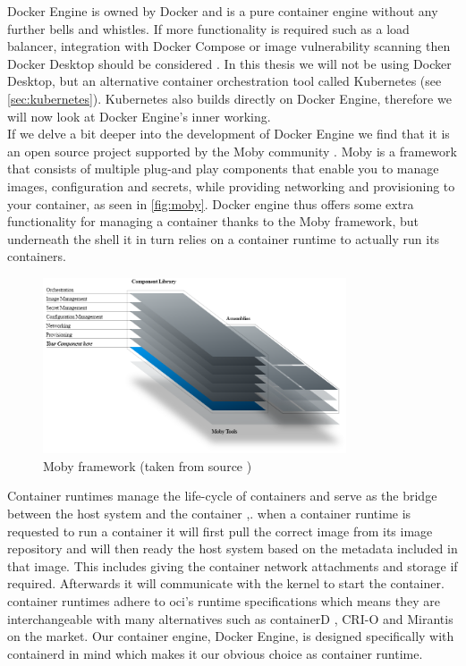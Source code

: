 Docker Engine is owned by Docker \cite{docker} and is a pure container engine without any further bells and whistles. If more functionality is required such as a load balancer, integration with Docker Compose or image vulnerability scanning then Docker Desktop should be considered \cite{comparisonenginevsdesktop}. In this thesis we will not be using Docker Desktop, but an alternative container orchestration tool called Kubernetes (see \autoref{sec:kubernetes}). Kubernetes also builds directly on Docker Engine, therefore we will now look at Docker Engine's inner working.
\\[10pt]

If we delve a bit deeper into the development of Docker Engine we find that it is an open source project supported by the Moby community \cite{moby}. Moby is a framework that consists of multiple plug-and play components that enable you to manage images, configuration and secrets, while providing networking  and provisioning to your container, as seen in \autoref{fig:moby}. Docker engine thus offers some extra functionality for managing a container thanks to the Moby framework, but underneath the shell it in turn relies on a container runtime to actually run its containers.
\\[10pt]

\begin{figure}[htbp]
  \centering
  \includegraphics[width=0.8\textwidth]{images/moby.png} 
  \caption{Moby framework (taken from source \cite{moby})}
  \label{fig:moby}
\end{figure}

 Container runtimes manage the life-cycle of containers and serve as the bridge between the host system and the container \cite{containerterminology},\cite{contruntime}. when a container runtime is requested to run a container it will first pull the correct image from its image repository and will then ready the host system based on the metadata included in that image. This includes  giving the container network attachments and storage if required. Afterwards it will communicate with the kernel to start the container. container runtimes adhere to \acrshort{oci}'s runtime specifications which means they are interchangeable with many alternatives such as containerD \cite{containerd}, CRI-O \cite{crio} and Mirantis \cite{mirantis} on the market. Our container engine, Docker Engine, is designed specifically with containerd in mind which makes it our obvious choice as container runtime.
\\[10pt]



